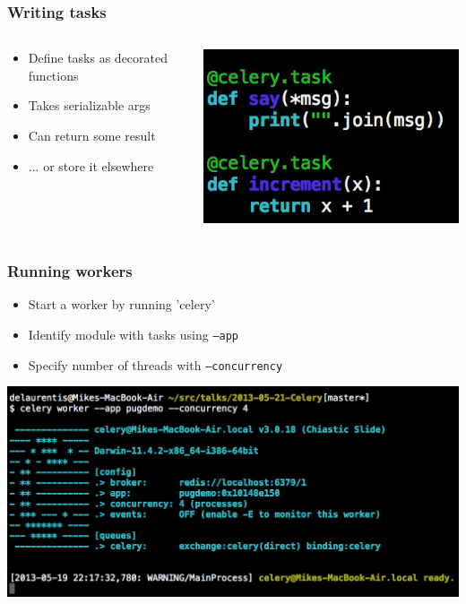 \documentclass{beamer}
\begin{document}
\begin{frame}
  \frametitle{Writing tasks}

  \begin{columns}
    \begin{column}{0.4\textwidth}

  \begin{itemize}
  \item Define tasks as decorated functions
  \item Takes serializable args
  \item Can return some result
  \item ... or store it elsewhere
  \end{itemize}
  \end{column}
    \begin{column}{0.6\textwidth}
      \includegraphics[scale=0.4]{tasks.png}
    \end{column}
  \end{columns}
\end{frame}

\begin{frame}
  \frametitle{Running workers}
  \begin{itemize}
  \item Start a worker by running 'celery' 
  \item Identify module with tasks using {\tt --app}
  \item Specify number of threads with {\tt --concurrency}
  \end{itemize}
  \begin{center}
    \includegraphics[scale=0.3]{startworker.png}    
  \end{center}
\end{frame}
\end{document}
